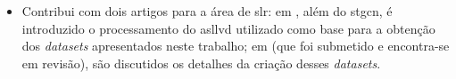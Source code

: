 \begin{itemize}
      \item Contribui com dois artigos para a área de \acrshort{slr}:
            em , além do \acrshort{stgcn}, é introduzido o processamento do \acrshort{asllvd} utilizado como base para a obtenção dos \textit{datasets} apresentados neste trabalho;
            em  (que foi submetido e encontra-se em revisão), são discutidos os detalhes da criação desses \textit{datasets}.

\end{itemize}








